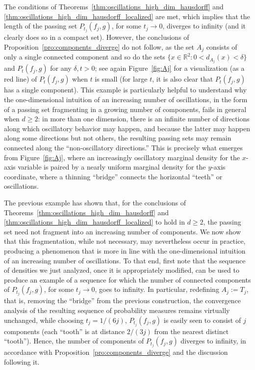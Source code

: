 \documentclass[12pt]{article}
\newcommand{\RR}{\mathbb{R}}
\begin{document}
The conditions of Theorems~\ref{thm:oscillations_high_dim_hausdorff} and \ref{thm:oscillations_high_dim_hausdorff_localized} are met, which implies that
the length of the passing set $P_{t_j}(f_j,g)$, for some $t_j\to0$, diverges to infinity (and it clearly does so in a compact set).
However, the conclusions of Proposition~\ref{pro:components_diverge} do not follow, as the set $A_j$
consists of only a single connected component and so do the sets
$\{x\in\RR^2 : 0<d_{A_j}(x)<\delta\}$ and $P_t(f_j,g)$ for any $\delta,t>0$;
see again Figure~\ref{fig:Aj} for a visualization (as a red line) of
$P_t(f_j,g)$ when $t$ is small (for large $t$, it is also clear that
$P_t(f_j,g)$ has a single component). This example is particularly helpful to understand why the one-dimensional intuition of an increasing number of oscillations, in the form of a passing set fragmenting in a growing number of components, fails in general when $d\geq 2$: in more than one dimension, there is an infinite number of directions along which oscillatory behavior may happen, and because the latter may happen along some directions but not others, the resulting passing sets may remain connected along the ``non-oscillatory directions.'' This is precisely what emerges from Figure~\ref{fig:Aj}, where an increasingly oscillatory marginal density for the $x$-axis variable is paired by a nearly uniform marginal density for the $y$-axis coordinate, where a thinning ``bridge'' connects the horizontal ``teeth'' or oscillations.

The previous example has shown that, for the conclusions of Theorems~\ref{thm:oscillations_high_dim_hausdorff} and \ref{thm:oscillations_high_dim_hausdorff_localized} to hold in $d\geq 2$, the passing set need not fragment into an increasing number of components. We now show that this fragmentation, while not necessary, may nevertheless occur in practice, producing a phenomenon that is more in line with the one-dimensional intuition of an increasing number of oscillations. To that end, first note that the sequence of densities we just analyzed, once it is appropriately modified, can be used to produce an example of a sequence for which the number of connected components of $P_{t_j}(f_j,g)$, for some $t_j\to 0$, goes to infinity. In particular, redefining $A_j:=T_j$, that is, removing the ``bridge'' from the previous construction, the convergence analysis of the resulting sequence of probability measures remains virtually unchanged, while choosing $t_j=1/(6j)$,  $P_{t_j}(f_j,g)$ is easily seen to consist of $j$ components (each ``tooth'' is at distance $2/(3j)$ from the nearest distinct ``tooth''). Hence, the number of components of $P_{t_j}(f_j,g)$ diverges to infinity, in accordance with Proposition~\ref{pro:components_diverge} and the discussion following it.
\end{document}
